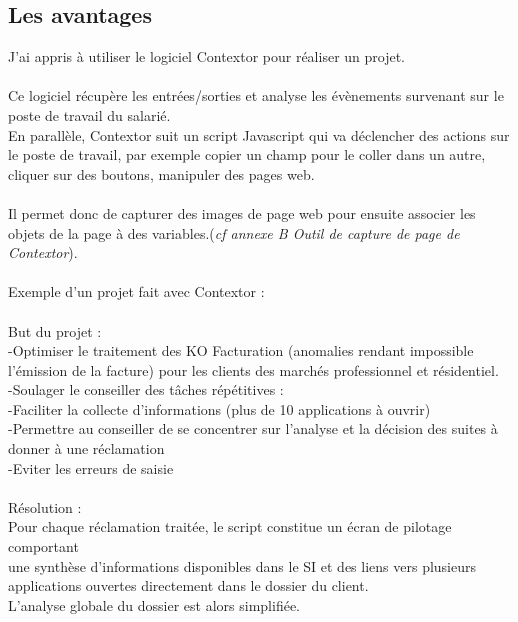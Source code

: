 \documentclass[a4paper,twoside,12pt]{report}
\begin{document}
\subsection{Les avantages}
J’ai appris à utiliser le logiciel Contextor pour réaliser un projet.\\\\ 
Ce logiciel récupère les entrées/sorties et analyse les évènements survenant sur le poste de travail du salarié.\\
En parallèle, Contextor suit un script Javascript qui va déclencher des actions sur le poste de travail, par exemple copier un champ pour le coller dans un autre, cliquer sur des boutons, manipuler des pages web.\\\\
Il permet donc de capturer des images de page web pour ensuite associer les objets de la page à des variables.(\emph{cf annexe B Outil de capture de page de Contextor}).\\\\
Exemple d'un projet fait avec Contextor :\\\\
But du projet :\\
-Optimiser le traitement des KO Facturation (anomalies rendant impossible l'émission de la facture) pour les clients des marchés professionnel et résidentiel.\\
-Soulager le conseiller des tâches répétitives :\\
-Faciliter la collecte d’informations (plus de 10 applications à ouvrir)\\
-Permettre au conseiller de se concentrer sur l’analyse et la décision des suites à donner à une réclamation\\
-Eviter les erreurs de saisie\\\\
Résolution :\\
Pour chaque réclamation traitée, le script constitue un écran de pilotage comportant\\
une synthèse d’informations disponibles dans le SI et des liens vers plusieurs applications ouvertes directement dans le dossier du client.\\ 
L'analyse globale du dossier est alors simplifiée.\\\\
\end{document}
